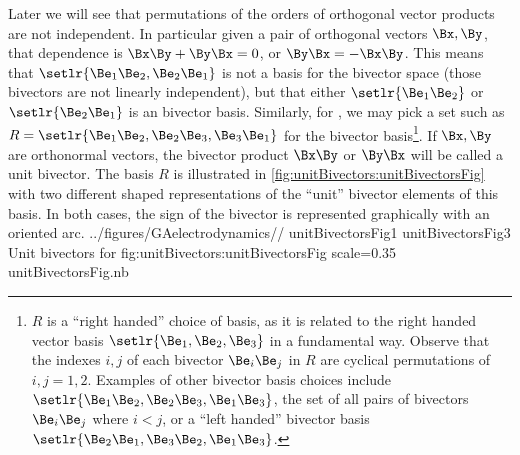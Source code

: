 Later we will see that permutations of the orders of orthogonal vector products are not independent.
In particular
given a pair of orthogonal vectors \( \Bx, \By \), that dependence is
\(\Bx \By + \By \Bx = 0 \),
or \( \By \Bx = - \Bx \By \).  This means that \( \setlr{ \Be_1 \Be_2, \Be_2 \Be_1 } \) is not a basis for the  bivector space (those bivectors are not linearly independent), but that either \( \setlr{ \Be_1 \Be_2 } \) or \( \setlr{ \Be_2 \Be_1 } \) is an  bivector basis.
Similarly, for , we may pick a set such as \( R = \setlr{ \Be_1 \Be_2, \Be_2 \Be_3, \Be_3 \Be_1 } \) for the bivector basis\footnote{\(R\) is a ``right handed'' choice of basis, as it is related to the right handed vector basis \( \setlr{ \Be_1, \Be_2, \Be_3 } \) in a fundamental way.  Observe that the indexes \( i, j \) of each bivector \( \Be_i \Be_j \) in \( R \) are cyclical permutations of \( i,j = 1,2 \).  Examples of other bivector basis choices include \( \setlr{ \Be_1 \Be_2, \Be_2 \Be_3, \Be_1 \Be_3 } \), the set of all pairs of bivectors \( \Be_i \Be_j \) where \( i < j \), or a ``left handed'' bivector basis
\( \setlr{ \Be_2 \Be_1, \Be_3 \Be_2, \Be_1 \Be_3 } \).}.
If \( \Bx, \By \) are orthonormal vectors, the bivector product \( \Bx \By \) or \( \By \Bx \) will be called a unit bivector.
The basis \( R \) is illustrated in
\cref{fig:unitBivectors:unitBivectorsFig} with two different shaped representations of the ``unit'' bivector elements of this basis.
In both cases, the sign of the bivector is represented graphically with an oriented arc.
\pmathImageTwoFigures
{../figures/GAelectrodynamics/\subfigdir/}
{unitBivectorsFig1}
{unitBivectorsFig3}
{Unit bivectors for }
{fig:unitBivectors:unitBivectorsFig}
{scale=0.35}
{unitBivectorsFig.nb}

